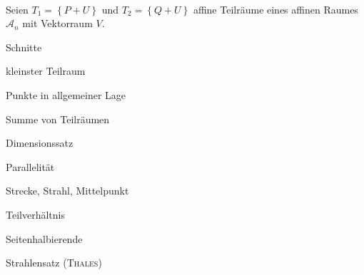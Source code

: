 \begin{mysatz}
    \ \\
    Seien $T_1 = \left\{ P+U \right\}$ und $T_2 = \left\{ Q+U \right\}$ affine Teilräume eines affinen Raumes $\mathcal{A}_n$ mit Vektorraum $V$.
\end{mysatz}

\begin{mysatz}
    Schnitte
\end{mysatz}

\begin{mylemma}
    kleinster Teilraum
\end{mylemma}

\begin{mydef}
    Punkte in allgemeiner Lage
\end{mydef}

\begin{mydef}
    Summe von Teilräumen
\end{mydef}

\begin{mysatz}
    Dimensionssatz
\end{mysatz}

\begin{mydef}
    Parallelität
\end{mydef}

\begin{mydef}
    Strecke, Strahl, Mittelpunkt
\end{mydef}

\begin{mydef}
    Teilverhältnis
\end{mydef}

\begin{mysatz}
    Seitenhalbierende
\end{mysatz}

\begin{mysatz}
    Strahlensatz (\textsc{Thales})
\end{mysatz}


